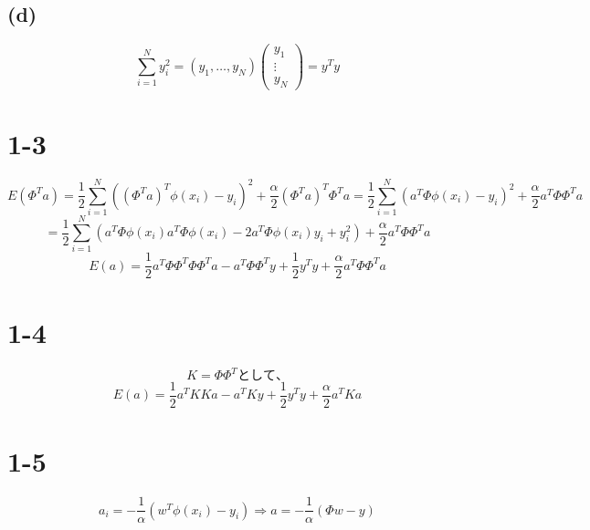 \documentclass[a4paper,11pt]{jsarticle}
\begin{document}
\subsection*{(d)}

\begin{equation*}
  \sum_{i=1}^{N} y_i^2 =
    (y_1, \ldots, y_N)
    \begin{pmatrix}
      y_1 \\
      \vdots \\
      y_N
    \end{pmatrix}
  = y^T y
\end{equation*}

\section*{1-3}
\begin{equation*}
  E(\Phi^T a)
    = \frac{1}{2} \sum_{i=1}^{N} ((\Phi^T a)^T \phi(x_i) - y_i)^2 + \frac{\alpha}{2} (\Phi^T a)^T \Phi^T a
    = \frac{1}{2} \sum_{i=1}^{N} (a^T \Phi \phi(x_i) - y_i)^2 + \frac{\alpha}{2} a^T \Phi \Phi^T a
\end{equation*}
\begin{equation*}
  = \frac{1}{2} \sum_{i=1}^{N} (a^T \Phi \phi(x_i) a^T \Phi \phi(x_i) - 2a^T \Phi \phi(x_i) y_i + y_i^2) + \frac{\alpha}{2} a^T \Phi \Phi^T a
\end{equation*}
\begin{equation*}
  E(a) = \frac{1}{2} a^T \Phi \Phi^T \Phi \Phi^T a - a^T \Phi \Phi^T y + \frac{1}{2} y^T y + \frac{\alpha}{2} a^T \Phi \Phi^T a
\end{equation*}

\section*{1-4}
\begin{equation*}
  K = \Phi \Phi^Tとして、
\end{equation*}
\begin{equation*}
  E(a) = \frac{1}{2} a^T K K a - a^T K y + \frac{1}{2} y^T y + \frac{\alpha}{2} a^T K a
\end{equation*}

\section*{1-5}
\begin{equation*}
  a_i = - \frac{1}{\alpha} (w^T \phi(x_i) - y_i) \Rightarrow a = - \frac{1}{\alpha} (\Phi w - y)
\end{equation*}
\end{document}
